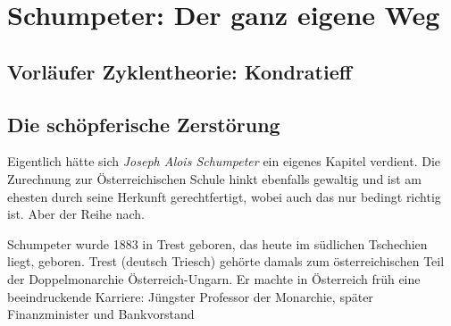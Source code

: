 %
%
%

\chapter{Schumpeter: Der ganz eigene Weg}
\label{Schumpeter}

\section{Vorläufer Zyklentheorie: Kondratieff}

\section{Die schöpferische Zerstörung}
Eigentlich hätte sich \textit{Joseph Alois Schumpeter} ein eigenes Kapitel verdient. Die Zurechnung zur Österreichischen Schule hinkt ebenfalls gewaltig und ist am ehesten durch seine Herkunft gerechtfertigt, wobei auch das nur bedingt richtig ist. Aber der Reihe nach.

Schumpeter wurde 1883 in Trest geboren, das heute im südlichen Tschechien liegt, geboren. Trest (deutsch Triesch) gehörte damals zum österreichischen Teil der Doppelmonarchie Österreich-Ungarn. Er machte in Österreich früh eine beeindruckende Karriere: Jüngster Professor der Monarchie, später Finanzminister und Bankvorstand

